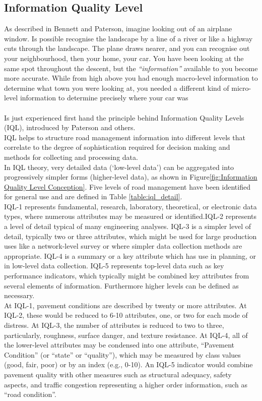 \documentclass{standalone}
\begin{document}
\subsection{Information Quality Level}\label{Information Quality Level}
\noindent As described in Bennett and Paterson\cite{bennett2000guide}, imagine looking out of an airplane window. Is possible recognise the landscape by a line of a river or like a highway cuts through the landscape. The plane draws nearer, and you can recognise out your neighbourhood, then your home, your car. You have been looking at the same spot throughout the descent, but the \textit{“information”} available to you become more accurate. While from high above you had enough macro-level information to determine what town you were looking at, you needed a different kind of micro-level information to determine precisely where your car was
\\\\
Is just experienced first hand the principle behind Information Quality Levels (IQL), introduced by Paterson and others\cite{paterson2}.\\ IQL helps to structure road management information into different levels that correlate to the degree of sophistication required for decision making and methods for collecting and processing data.
\\
In IQL theory, very detailed data (‘low-level data’) can be aggregated into progressively simpler forms (higher-level data), as shown in Figure\ref{fig:Information Quality Level Conception}. Five levels of road management have been identified for general use and are defined in Table \ref{table:iql_detail}.
\\
\noindent IQL-1 represents fundamental, research, laboratory, theoretical, or electronic data types, where numerous attributes may be measured or identified.IQL-2 represents a level of detail typical of many engineering analyses.
IQL-3 is a simpler level of detail, typically two or three attributes, which might be used for large production uses like a network-level survey or where simpler data collection methods are appropriate.
IQL-4 is a summary or a key attribute which has use in planning, or in low-level data collection.
IQL-5 represents top-level data such as key performance indicators, which typically might be combined key attributes from several elements of information. Furthermore higher levels can be defined as necessary. \\
At IQL-1, pavement conditions are described by twenty or more attributes.
At IQL-2, these would be reduced to 6-10 attributes, one, or two for each mode of distress.
 At IQL-3, the number of attributes is reduced to two to three, particularly, roughness, surface danger, and texture resistance.
At IQL-4, all of the lower-level attributes may be condensed into one attribute, “Pavement Condition” (or “state” or “quality”), which may be measured by class values (good, fair, poor) or by an index (e.g., 0-10).
An IQL-5 indicator would combine pavement quality with other measures such as structural adequacy, safety aspects, and traffic congestion representing a higher order information, such as “road condition”.\\
\end{document}
